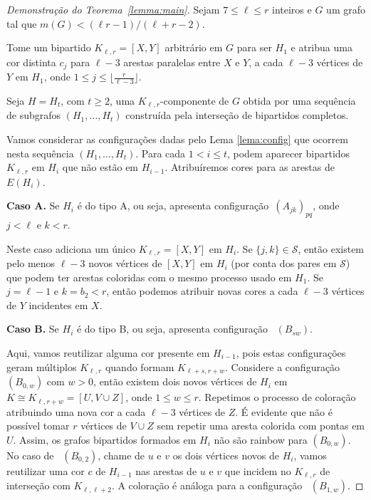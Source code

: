 \documentclass[12pt,a4paper]{book}
\newcommand{\K}{K_{\ell,r}} %
\begin{document}
    \begin{proof}[Demonstração do Teorema~\ref{lemma:main}]
      Sejam $7 \leq \ell \leq r$ inteiros e $G$ um grafo tal que $m(G) < (\ell r - 1)/(\ell+r-2)$.
    
        Tome um bipartido $\K = [X,Y]$ arbitrário em $G$ para ser $H_1$ e atribua uma cor distinta $c_j$ para $\ell-3$ arestas paralelas entre $X$ e $Y$, a cada $\ell-3$ vértices de $Y$ em $H_1$, onde
        $1 \leq j \leq \lfloor \frac{r}{\ell-3}\rfloor$.

        Seja $H = H_t$, com $t \geq 2$, uma $\K$-componente de $G$ obtida por uma sequência de subgrafos $(H_1, \ldots, H_t)$ construída pela interseção de bipartidos completos.

         Vamos considerar as configurações dadas pelo Lema \ref{lema:config} que ocorrem nesta sequência $(H_1, \ldots, H_t)$.
         Para cada $1 < i \leq t$, podem aparecer bipartidos $\K$ em $H_{i}$ que não estão em $H_{i-1}$.
         Atribuíremos cores para as arestas de $E(H_{i})$.

         \medskip \textbf{Caso A.} Se $H_i$ é do tipo A, ou seja, apresenta configuração~\hyperref[configA]{$(A_{jk})_{pq}$}, onde $j < \ell$ e $k < r$.
         
        Neste caso adiciona um único $\K = [X,Y]$ em $H_i$.        
      Se $\{j,k\} \in \mathcal{S}$, então existem pelo menos $\ell-3$ novos vértices de $[X,Y]$ em $H_i$ (por conta dos pares em $\mathcal{S}$) que podem ter arestas coloridas com o mesmo processo usado em $H_1$.        
      Se $j = \ell-1$ e $k=b_2 < r$, então podemos atribuir novas cores a cada $\ell-3$ vértices de $Y$ incidentes em $X$.

        \medskip \textbf{Caso B.} Se $H_i$ é do tipo B, ou seja, apresenta configuração ~\hyperref[configB]{$(B_{sw})$}.
        
        Aqui, vamos reutilizar alguma cor presente em $H_{i-1}$, pois estas configurações geram múltiplos $\K$ quando formam $K_{\ell+s,r+w}$.        
      Considere a configuração ~\hyperref[configB]{$(B_{0,w})$} com $w > 0$, então existem dois novos vértices de
      $H_i$ em $K \cong K_{\ell,r+w} =[U, V \cup Z]$, 
      onde $1 \leq w \leq r$.  
      Repetimos o processo de coloração atribuindo uma nova cor a cada $\ell-3$ 
     vértices de $Z$.
      É evidente que não é possível tomar $r$ vértices de $V \cup Z$ sem repetir uma aresta colorida com pontas em $U$.
      Assim, os grafos bipartidos formados em $H_i$ não são rainbow para $(B_{0,w})$.  
	  No caso de ~\hyperref[configB]{$(B_{0,2})$}, chame de $u$ e $v$ os dois vértices novos de $H_i$, vamos reutilizar uma cor $c$ de $H_{i-1}$ nas arestas de $u$ e $v$ que incidem no $\K$ de interseção com $K_{\ell,\ell+2}$.  
        A coloração é análoga para a configuração ~\hyperref[configB]{$(B_{1,w})$}.


\end{proof}
\end{document}
